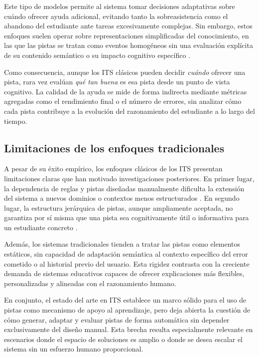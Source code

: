 \documentclass[../main.tex]{subfiles}
\begin{document}
Este tipo de modelos permite al sistema tomar decisiones adaptativas sobre cuándo ofrecer ayuda adicional, evitando tanto la sobreasistencia como el abandono del estudiante ante tareas excesivamente complejas. Sin embargo, estos enfoques suelen operar sobre representaciones simplificadas del conocimiento, en las que las pistas se tratan como eventos homogéneos sin una evaluación explícita de su contenido semántico o su impacto cognitivo específico \cite{VanLehn2006}.

Como consecuencia, aunque los ITS clásicos pueden decidir \textit{cuándo} ofrecer una pista, rara vez evalúan \textit{qué tan buena} es esa pista desde un punto de vista cognitivo. La calidad de la ayuda se mide de forma indirecta mediante métricas agregadas como el rendimiento final o el número de errores, sin analizar cómo cada pista contribuye a la evolución del razonamiento del estudiante a lo largo del tiempo.

\subsection{Limitaciones de los enfoques tradicionales}

A pesar de su éxito empírico, los enfoques clásicos de los ITS presentan limitaciones claras que han motivado investigaciones posteriores. En primer lugar, la dependencia de reglas y pistas diseñadas manualmente dificulta la extensión del sistema a nuevos dominios o contextos menos estructurados \cite{KoedingerAleven2007}. En segundo lugar, la estructura jerárquica de pistas, aunque ampliamente aceptada, no garantiza por sí misma que una pista sea cognitivamente útil o informativa para un estudiante concreto \cite{Aleven2016HelpHelps}.

Además, los sistemas tradicionales tienden a tratar las pistas como elementos estáticos, sin capacidad de adaptación semántica al contexto específico del error cometido o al historial previo del usuario. Esta rigidez contrasta con la creciente demanda de sistemas educativos capaces de ofrecer explicaciones más flexibles, personalizadas y alineadas con el razonamiento humano.

En conjunto, el estado del arte en ITS establece un marco sólido para el uso de pistas como mecanismo de apoyo al aprendizaje, pero deja abierta la cuestión de cómo generar, adaptar y evaluar pistas de forma automática sin depender exclusivamente del diseño manual. Esta brecha resulta especialmente relevante en escenarios donde el espacio de soluciones es amplio o donde se desea escalar el sistema sin un esfuerzo humano proporcional.
\end{document}

